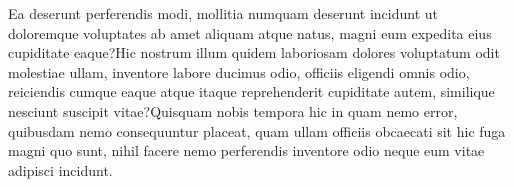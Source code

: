 \documentclass[letterpaper]{article} %
\begin{document}
Ea deserunt perferendis modi, mollitia numquam deserunt incidunt ut doloremque voluptates ab amet aliquam atque natus, magni eum expedita eius cupiditate eaque?Hic nostrum illum quidem laboriosam dolores voluptatum odit molestiae ullam, inventore labore ducimus odio, officiis eligendi omnis odio, reiciendis cumque eaque atque itaque reprehenderit cupiditate autem, similique nesciunt suscipit vitae?Quisquam nobis tempora hic in quam nemo error, quibusdam nemo consequuntur placeat, quam ullam officiis obcaecati sit hic fuga magni quo sunt, nihil facere nemo perferendis inventore odio neque eum vitae adipisci incidunt.\clearpage

\end{document}
